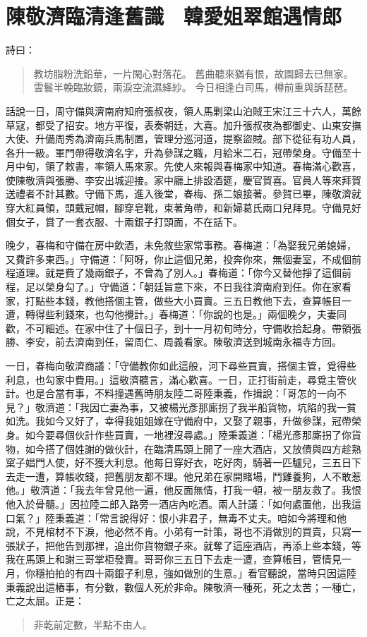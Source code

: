 
\chapter{陳敬濟臨清逢舊識　韓愛姐翠館遇情郎}

詩曰：
\begin{quote}
教坊脂粉洗鉛華，一片閑心對落花。
舊曲聽來猶有恨，故園歸去已無家。
雲鬟半輓臨妝鏡，兩淚空流濕絳紗。
今日相逢白司馬，樽前重與訴琵琶。
\end{quote}

話說一日，周守備與濟南府知府張叔夜，領人馬剿梁山泊賊王宋江三十六人，萬餘草寇，都受了招安。地方平復，表奏朝廷，大喜。加升張叔夜為都御史、山東安撫大使、升備周秀為濟南兵馬制置，管理分巡河道，提察盜賊。部下從征有功人員，各升一級。軍門帶得敬濟名字，升為參謀之職，月給米二石，冠帶榮身。守備至十月中旬，領了敕書，率領人馬來家。先使人來報與春梅家中知道。春梅滿心歡喜，使陳敬濟與張勝、李安出城迎接。家中廳上排設酒筵，慶官賀喜。官員人等來拜賀送禮者不計其數。守備下馬，進入後堂，春梅、孫二娘接著。參賀已畢，陳敬濟就穿大紅員領，頭戴冠帽，腳穿皂靴，束著角帶，和新婦葛氏兩口兒拜見。守備見好個女子，賞了一套衣服、十兩銀子打頭面，不在話下。

晚夕，春梅和守備在房中飲酒，未免敘些家常事務。春梅道：「為娶我兄弟媳婦，又費許多東西。」守備道：「阿呀，你止這個兄弟，投奔你來，無個妻室，不成個前程道理。就是費了幾兩銀子，不曾為了別人。」春梅道：「你今又替他掙了這個前程，足以榮身勾了。」守備道：「朝廷旨意下來，不日我往濟南府到任。你在家看家，打點些本錢，教他搭個主管，做些大小買賣。三五日教他下去，查算帳目一遭，轉得些利錢來，也勾他攪計。」春梅道：「你說的也是。」兩個晚夕，夫妻同歡，不可細述。在家中住了十個日子，到十一月初旬時分，守備收拾起身。帶領張勝、李安，前去濟南到任，留周仁、周義看家。陳敬濟送到城南永福寺方回。

一日，春梅向敬濟商議：「守備教你如此這般，河下尋些買賣，搭個主管，覓得些利息，也勾家中費用。」這敬濟聽言，滿心歡喜。一日，正打街前走，尋覓主管伙計。也是合當有事，不料撞遇舊時朋友陸二哥陸秉義，作揖說：「哥怎的一向不見？」敬濟道：「我因亡妻為事，又被楊光彥那廝拐了我半船貨物，坑陷的我一貧如洗。我如今又好了，幸得我姐姐嫁在守備府中，又娶了親事，升做參謀，冠帶榮身。如今要尋個伙計作些買賣，一地裡沒尋處。」陸秉義道：「楊光彥那廝拐了你貨物，如今搭了個姓謝的做伙計，在臨清馬頭上開了一座大酒店，又放債與四方趁熟窠子娼門人使，好不獲大利息。他每日穿好衣，吃好肉，騎著一匹驢兒，三五日下去走一遭，算帳收錢，把舊朋友都不理。他兄弟在家開賭場，鬥雞養狗，人不敢惹他。」敬濟道：「我去年曾見他一遍，他反面無情，打我一頓，被一朋友救了。我恨他入於骨髓。」因拉陸二郎入路旁一酒店內吃酒。兩人計議：「如何處置他，出我這口氣？」陸秉義道：「常言說得好：恨小非君子，無毒不丈夫。咱如今將理和他說，不見棺材不下淚，他必然不肯。小弟有一計策，哥也不消做別的買賣，只寫一張狀子，把他告到那裡，追出你貨物銀子來。就奪了這座酒店，再添上些本錢，等我在馬頭上和謝三哥掌柜發賣。哥哥你三五日下去走一遭，查算帳目，管情見一月，你穩拍拍的有四十兩銀子利息，強如做別的生意。」看官聽說，當時只因這陸秉義說出這樁事，有分數，數個人死於非命。陳敬濟一種死，死之太苦；一種亡，亡之太屈。正是：
\begin{quote}
非乾前定數，半點不由人。
\end{quote}

